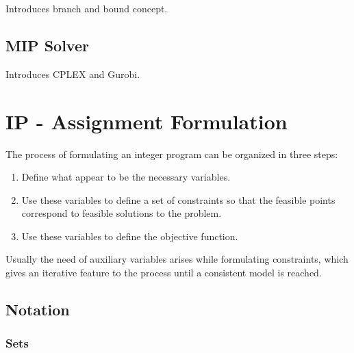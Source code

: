 Introduces branch and bound concept.


\subsection{MIP Solver}

Introduces CPLEX and Gurobi.




\section{IP - Assignment Formulation}

The process of formulating an integer program can be organized in three steps:

\begin{enumerate}
\item Define what appear to be the necessary variables.
\item Use these variables to define a set of constraints so that the feasible points correspond to feasible solutions to the problem.
\item Use these variables to define the objective function.
\end{enumerate}

Usually the need of auxiliary variables arises while formulating constraints, which gives an iterative feature to the process until a consistent model is reached.



\subsection{Notation}

\subsubsection{Sets}

